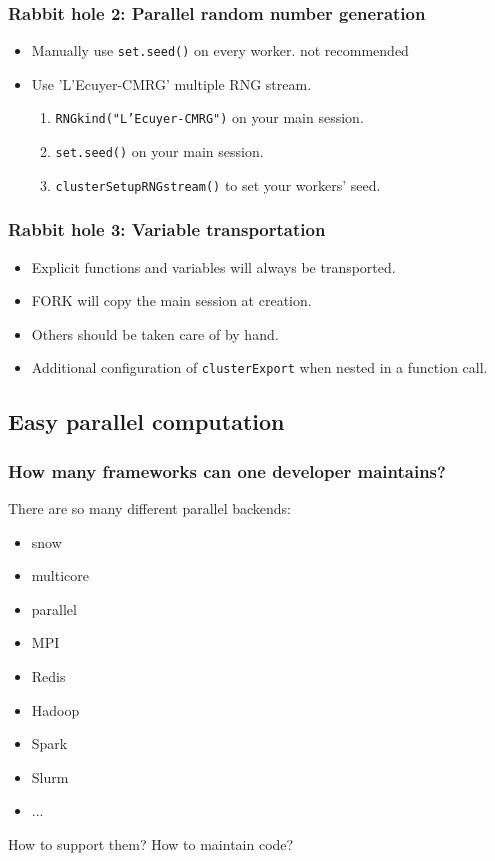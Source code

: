 \documentclass[aspectratio=169,xcolor={dvipsnames,table}]{beamer}
\begin{document}
\begin{frame}
  \frametitle{Rabbit hole 2: Parallel random number generation}
  \begin{itemize}
  \item Manually use \texttt{set.seed()} on every worker. {\color{brown} not recommended}
  \item Use 'L’Ecuyer-CMRG' multiple RNG stream.
    \begin{enumerate}
    \item \texttt{RNGkind("L'Ecuyer-CMRG")} on your main session.
    \item \texttt{set.seed()} on your main session.
    \item \texttt{clusterSetupRNGstream()} to set your workers' seed.
    \end{enumerate}
  \end{itemize}
\end{frame}

\begin{frame}[fragile]
  \frametitle{Rabbit hole 3: Variable transportation}
  \begin{itemize}
  \item Explicit functions and variables will always be transported.
  \item FORK will copy the main session at creation.
  \item Others should be taken care of by hand.
  \item Additional configuration of \texttt{clusterExport} when nested in a function call.
  \end{itemize}
\end{frame}

\subsection{Easy parallel computation}
\begin{frame}
  \frametitle{How many frameworks can one developer maintains?}
  There are so many different parallel backends:
  \begin{itemize}
  \item snow
  \item multicore
  \item parallel
  \item MPI
  \item Redis
  \item Hadoop
  \item Spark
  \item Slurm
  \item ...
  \end{itemize}
  How to support them? How to maintain code?
\end{frame}
\end{document}
